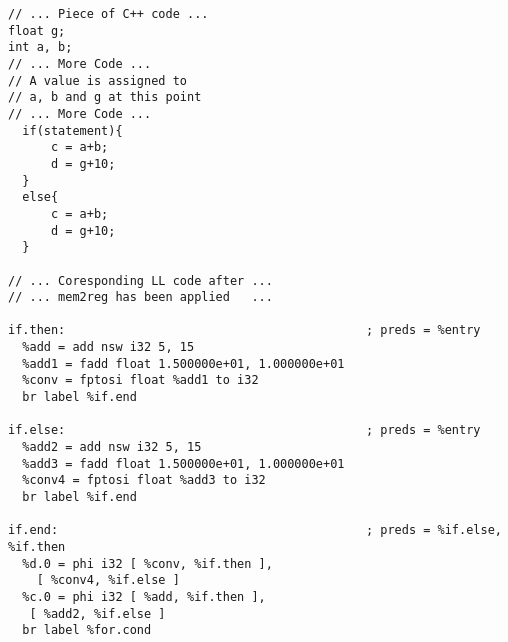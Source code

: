 \begin{lstlisting}[caption=Merging in Available Expression Analysis preview, label=mAEA]
// ... Piece of C++ code ...
float g;
int a, b;
// ... More Code ...
// A value is assigned to
// a, b and g at this point
// ... More Code ...
  if(statement){
	  c = a+b;
	  d = g+10;
  }
  else{
	  c = a+b;
	  d = g+10;
  }

// ... Coresponding LL code after ...
// ... mem2reg has been applied   ...

if.then:                                          ; preds = %entry
  %add = add nsw i32 5, 15
  %add1 = fadd float 1.500000e+01, 1.000000e+01
  %conv = fptosi float %add1 to i32
  br label %if.end

if.else:                                          ; preds = %entry
  %add2 = add nsw i32 5, 15
  %add3 = fadd float 1.500000e+01, 1.000000e+01
  %conv4 = fptosi float %add3 to i32
  br label %if.end

if.end:                                           ; preds = %if.else, %if.then
  %d.0 = phi i32 [ %conv, %if.then ], 
    [ %conv4, %if.else ]
  %c.0 = phi i32 [ %add, %if.then ], 
   [ %add2, %if.else ]
  br label %for.cond
  
\end{lstlisting}
